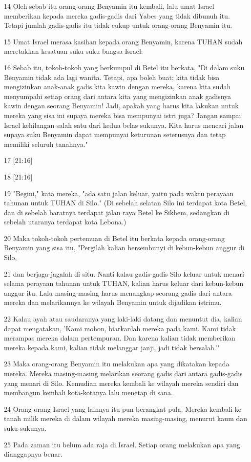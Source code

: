 \par 14 Oleh sebab itu orang-orang Benyamin itu kembali, lalu umat Israel memberikan kepada mereka gadis-gadis dari Yabes yang tidak dibunuh itu. Tetapi jumlah gadis-gadis itu tidak cukup untuk orang-orang Benyamin itu.
\par 15 Umat Israel merasa kasihan kepada orang Benyamin, karena TUHAN sudah meretakkan kesatuan suku-suku bangsa Israel.
\par 16 Sebab itu, tokoh-tokoh yang berkumpul di Betel itu berkata, "Di dalam suku Benyamin tidak ada lagi wanita. Tetapi, apa boleh buat; kita tidak bisa mengizinkan anak-anak gadis kita kawin dengan mereka, karena kita sudah menyumpahi setiap orang dari antara kita yang mengizinkan anak gadisnya kawin dengan seorang Benyamin! Jadi, apakah yang harus kita lakukan untuk mereka yang sisa ini supaya mereka bisa mempunyai istri juga? Jangan sampai Israel kehilangan salah satu dari kedua belas sukunya. Kita harus mencari jalan supaya suku Benyamin dapat mempunyai keturunan seterusnya dan tetap memiliki seluruh tanahnya."
\par 17 [21:16]
\par 18 [21:16]
\par 19 "Begini," kata mereka, "ada satu jalan keluar, yaitu pada waktu perayaan tahunan untuk TUHAN di Silo." (Di sebelah selatan Silo ini terdapat kota Betel, dan di sebelah baratnya terdapat jalan raya Betel ke Sikhem, sedangkan di sebelah utaranya terdapat kota Lebona.)
\par 20 Maka tokoh-tokoh pertemuan di Betel itu berkata kepada orang-orang Benyamin yang sisa itu, "Pergilah kalian bersembunyi di kebun-kebun anggur di Silo,
\par 21 dan berjaga-jagalah di situ. Nanti kalau gadis-gadis Silo keluar untuk menari selama perayaan tahunan untuk TUHAN, kalian harus keluar dari kebun-kebun anggur itu. Lalu masing-masing harus menangkap seorang gadis dari antara mereka dan melarikannya ke wilayah Benyamin untuk dijadikan istrimu.
\par 22 Kalau ayah atau saudaranya yang laki-laki datang dan menuntut dia, kalian dapat mengatakan, 'Kami mohon, biarkanlah mereka pada kami. Kami tidak merampas mereka dalam pertempuran. Dan karena kalian tidak memberikan mereka kepada kami, kalian tidak melanggar janji, jadi tidak bersalah.'"
\par 23 Maka orang-orang Benyamin itu melakukan apa yang dikatakan kepada mereka. Mereka masing-masing melarikan seorang gadis dari antara gadis-gadis yang menari di Silo. Kemudian mereka kembali ke wilayah mereka sendiri dan membangun kembali kota-kotanya lalu menetap di sana.
\par 24 Orang-orang Israel yang lainnya itu pun berangkat pula. Mereka kembali ke tanah milik mereka di dalam wilayah mereka masing-masing, menurut kaum dan suku-sukunya.
\par 25 Pada zaman itu belum ada raja di Israel. Setiap orang melakukan apa yang dianggapnya benar.


